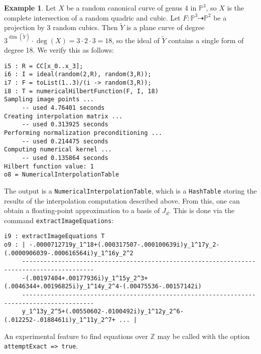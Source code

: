 \documentclass[letter]{amsart}
\theoremstyle{definition}
\newtheorem{example}[prop]{Example}
\begin{document}
\begin{example} \label{canonicalCurveEx}
Let $X$ be a random canonical curve of genus 4 in ${\mathbb{P}}^3$, so $X$ is the complete intersection of a random quadric and cubic.
Let $F : {\mathbb{P}}^3 \dashrightarrow {\mathbb{P}}^2$ be a projection by 3 random cubics.
Then $\widetilde{Y}$ is a plane curve of degree $3^{\dim(\widetilde{Y})} \cdot \deg(X) = 3 \cdot 2 \cdot 3 =18$,
so the ideal of $\widetilde{Y}$ contains a single form of degree 18.  We verify this as follows:

\begin{verbatim}
i5 : R = CC[x_0..x_3];
i6 : I = ideal(random(2,R), random(3,R));
i7 : F = toList(1..3)/(i -> random(3,R));
i8 : T = numericalHilbertFunction(F, I, 18)
Sampling image points ...
     -- used 4.76401 seconds
Creating interpolation matrix ...
     -- used 0.313925 seconds
Performing normalization preconditioning ...
     -- used 0.214475 seconds
Computing numerical kernel ...
     -- used 0.135864 seconds
Hilbert function value: 1
o8 = NumericalInterpolationTable
\end{verbatim}

\vspace{0.1cm}

The output is a \texttt{NumericalInterpolationTable}, which is a \texttt{HashTable} storing the results of the interpolation computation described above.  From this, one can obtain a floating-point approximation to a basis of $J_d$.  This is done via the command \texttt{extractImageEquations}:

\begin{verbatim}
i9 : extractImageEquations T
o9 : | -.0000712719y_1^18+(.000317507-.000100639i)y_1^17y_2-(.0000906039-.000616564i)y_1^16y_2^2
     ------------------------------------------------------------------------------------------
     -(.00197404+.00177936i)y_1^15y_2^3+(.0046344+.00196825i)y_1^14y_2^4-(.00475536-.00157142i)
     ------------------------------------------------------------------------------------------
     y_1^13y_2^5+(.00550602-.0100492i)y_1^12y_2^6-(.012252-.0188461i)y_1^11y_2^7+ ... |
\end{verbatim}

\vspace{0.2cm}

An experimental feature to find equations over ${\mathbb{Z}}$ may be called with the option \texttt{attemptExact => true}.
\end{example}

\vspace{0.2cm}
\end{document}
